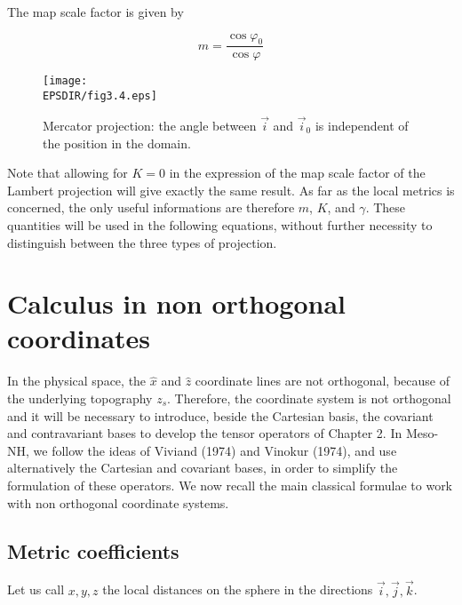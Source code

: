The map scale factor is given by

\begin{equation}
m = \dfrac{\cos\varphi _{0} }{\cos\varphi }
\end{equation}

\begin{figure}[!ht]
\centerline{\texttt{[image: \\EPSDIR/fig3.4.eps]}}
\caption{Mercator projection: the angle between $\vec{i}$ and $\vec{i}_0$
is independent of the position in the domain.}
\label{mercator}
\end{figure}

Note that allowing for $K=0$ in the expression of the map scale factor of
the Lambert projection will give exactly the same result. As far as the
local metrics is concerned, the only useful informations are therefore
$m$, $K$, and $\gamma$. These quantities
 will be used in the following equations, without further
necessity to distinguish between the three types of projection.

\section{Calculus in non orthogonal coordinates}

In the physical space, the $\widehat{x}$ and $\widehat{z}$ coordinate lines
are not orthogonal, because of the underlying topography $z_s$. Therefore,
the coordinate system is not orthogonal and it will be necessary to introduce,
beside the Cartesian basis, the covariant and contravariant bases to
develop the tensor operators of Chapter 2. In Meso-NH, we follow the ideas
of Viviand (1974) and Vinokur (1974), and use alternatively the
Cartesian and covariant bases, in order to simplify the formulation of
these operators. We now recall the main classical formulae to work with
non orthogonal coordinate systems.

\subsection{Metric coefficients}

Let us call $x,y,z$ the local distances on the sphere in the directions
$\vec{i},\vec{j},\vec{k}$.

